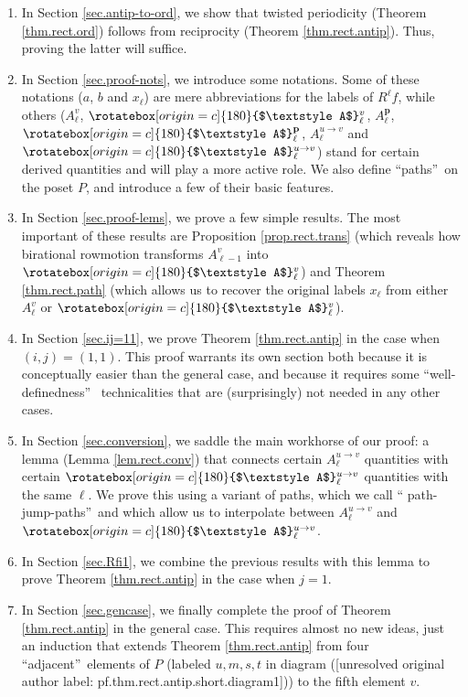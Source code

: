 \documentclass[numbers=enddot,12pt,final,onecolumn,notitlepage]{scrartcl}%
\theoremstyle{definition}
\newcommand{\upslack}{\mathchoice{\rotatebox[origin=c]{180}{$\displaystyle A$}}{\rotatebox[origin=c]{180}{$\textstyle A$}}{\rotatebox[origin=c]{180}{$\scriptstyle A$}}{\rotatebox[origin=c]{180}{$\scriptscriptstyle A$}}}
\newcommand{\downslack}{A}
\begin{document}
\begin{enumerate}
\item In Section \ref{sec.antip-to-ord}, we show that twisted periodicity
(Theorem \ref{thm.rect.ord}) follows from reciprocity (Theorem
\ref{thm.rect.antip}). Thus, proving the latter will suffice.

\item In Section \ref{sec.proof-nots}, we introduce some notations. Some of
these notations ($a$, $b$ and $x_{\ell}$) are mere abbreviations for the
labels of $R^{\ell}f$, while others ($\downslack_{\ell}^{v}$, $\upslack_{\ell
}^{v}$, $\downslack_{\ell}^{\mathbf{p}}$, $\upslack_{\ell}^{\mathbf{p}}$,
$\downslack_{\ell}^{u\rightarrow v}$ and $\upslack_{\ell}^{u\rightarrow v}$)
stand for certain derived quantities and will play a more active role. We also
define \textquotedblleft paths\textquotedblright\ on the poset $P$, and
introduce a few of their basic features.

\item In Section \ref{sec.proof-lems}, we prove a few simple results. The most
important of these results are Proposition \ref{prop.rect.trans} (which
reveals how birational rowmotion transforms $\downslack_{\ell-1}^{v}$ into
$\upslack_{\ell}^{v}$) and Theorem \ref{thm.rect.path} (which allows us to
recover the original labels $x_{\ell}$ from either $\downslack_{\ell}^{v}$ or
$\upslack_{\ell}^{v}$).

\item In Section \ref{sec.ij=11}, we prove Theorem \ref{thm.rect.antip} in the
case when $\left(  i,j\right)  =\left(  1,1\right)  $. This proof warrants its
own section both because it is conceptually easier than the general case, and
because it requires some \textquotedblleft well-definedness\textquotedblright%
\ technicalities that are (surprisingly) not needed in any other cases.

\item In Section \ref{sec.conversion}, we saddle the main workhorse of our
proof: a lemma (Lemma \ref{lem.rect.conv}) that connects certain
$\downslack_{\ell}^{u\rightarrow v}$ quantities with certain $\upslack_{\ell
}^{u\rightarrow v}$ quantities with the same $\ell$. We prove this using a
variant of paths, which we call \textquotedblleft
path-jump-paths\textquotedblright\ and which allow us to interpolate between
$\downslack_{\ell}^{u\rightarrow v}$ and $\upslack_{\ell}^{u\rightarrow v}$.

\item In Section \ref{sec.Rfi1}, we combine the previous results with this
lemma to prove Theorem \ref{thm.rect.antip} in the case when $j=1$.

\item In Section \ref{sec.gencase}, we finally complete the proof of Theorem
\ref{thm.rect.antip} in the general case. This requires almost no new ideas,
just an induction that extends Theorem \ref{thm.rect.antip} from four
\textquotedblleft adjacent\textquotedblright\ elements of $P$ (labeled
$u,m,s,t$ in diagram (\textnormal{[unresolved original author label: pf.thm.rect.antip.short.diagram1]})) to the fifth
element $v$.
\end{enumerate}
\end{document}
